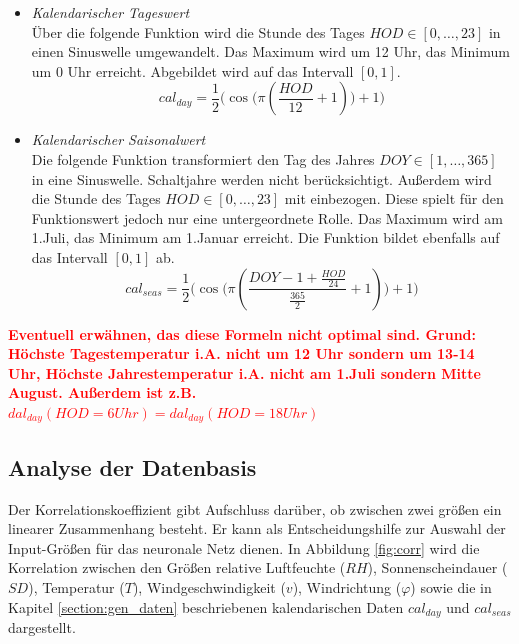 \documentclass[
12pt, %
toc=listofnumbered, %
toc=chapterentrydotfill, %
numbers=noenddot, %
captions=tableheading, %
bibliography=numbered
]{scrreprt}
\let\Oldsubsection\subsection
\renewcommand{\subsection}{\FloatBarrier\Oldsubsection}
\newcommand{\highlight}[1]{\textbf{\textcolor{red}{#1}}}
\begin{document}
\begin{itemize}
	\item \textit{Kalendarischer Tageswert}\\
	Über die folgende Funktion wird die Stunde des Tages $HOD \in [0, \dots, 23]$ in einen Sinuswelle umgewandelt. Das Maximum wird um 12 Uhr, das Minimum um 0 Uhr erreicht. Abgebildet wird auf das Intervall $[0,1]$.
	\begin{equation}\label{eq:cal_day}
		cal_{day} = \frac{1}{2}\Big(\cos \big(\pi (\frac{HOD}{12}+ 1)\big) + 1 \Big)
	\end{equation}
	\item \textit{Kalendarischer Saisonalwert}\\
	Die folgende Funktion transformiert den Tag des Jahres $DOY \in [1, \dots, 365]$ in eine Sinuswelle. Schaltjahre werden nicht berücksichtigt. Außerdem wird die Stunde des Tages $HOD \in [0, \dots, 23]$ mit einbezogen. Diese spielt für den Funktionswert jedoch nur eine untergeordnete Rolle. Das Maximum wird am 1.Juli, das Minimum am 1.Januar erreicht. Die Funktion bildet ebenfalls auf das Intervall $[0,1]$ ab.
	\begin{equation}\label{eq:cal_seas}
		cal_{seas} = \frac{1}{2}\Big(\cos\big(\pi (\frac{DOY -1 + \frac{HOD}{24}}{\frac{365}{2}}+ 1)\big) + 1\Big)
	\end{equation}
	
\end{itemize}

\highlight{Eventuell erwähnen, das diese Formeln nicht optimal sind. Grund: Höchste Tagestemperatur i.A. nicht um 12 Uhr sondern um 13-14 Uhr, Höchste Jahrestemperatur i.A. nicht am 1.Juli sondern Mitte August. Außerdem ist z.B. $dal_{day}(HOD=6Uhr) = dal_{day}(HOD=18Uhr)$}

\subsection{Analyse der Datenbasis}
Der Korrelationskoeffizient gibt Aufschluss darüber, ob zwischen zwei größen ein linearer Zusammenhang besteht. Er kann als Entscheidungshilfe zur Auswahl der Input-Größen für das neuronale Netz dienen. In Abbildung \ref{fig:corr} wird die Korrelation zwischen den Größen relative Luftfeuchte ($RH$), Sonnenscheindauer ($SD$), Temperatur ($T$), Windgeschwindigkeit ($v$), Windrichtung ($\varphi$) sowie die in Kapitel \ref{section:gen_daten} beschriebenen kalendarischen Daten $cal_{day}$ und $cal_{seas}$ dargestellt. 
\end{document}
